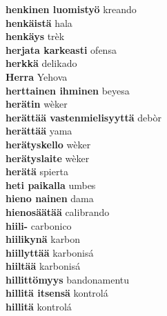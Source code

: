\textbf{ henkinen luomistyö  } kreando \\
\textbf{ henkäistä  } hala \\
\textbf{ henkäys  } trèk \\
\textbf{ herjata karkeasti  } ofensa \\
\textbf{ herkkä  } delikado \\
\textbf{ Herra  } Yehova \\
\textbf{ herttainen ihminen  } beyesa \\
\textbf{ herätin  } wèker \\
\textbf{ herättää vastenmielisyyttä  } debòr \\
\textbf{ herättää  } yama \\
\textbf{ herätyskello  } wèker \\
\textbf{ herätyslaite  } wèker \\
\textbf{ herätä  } spierta \\
\textbf{ heti paikalla  } umbes \\
\textbf{ hieno nainen  } dama \\
\textbf{ hienosäätää  } calibrando \\
\textbf{ hiili-  } carbonico \\
\textbf{ hiilikynä  } karbon \\
\textbf{ hiillyttää  } karbonisá \\
\textbf{ hiiltää  } karbonisá \\
\textbf{ hillittömyys  } bandonamentu \\
\textbf{ hillitä itsensä  } kontrolá \\
\textbf{ hillitä  } kontrolá \\
